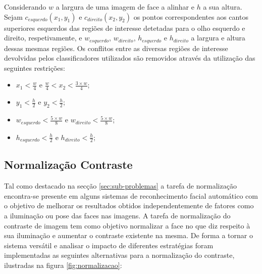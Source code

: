 Considerando $w$ a largura de uma imagem de face a alinhar e $h$ a sua altura. Sejam $c_{esquerdo}(x_1,y_1)$ e  $c_{direito}(x_2,y_2)$  os pontos correspondentes aos cantos superiores esquerdos das regiões de interesse detetadas para o olho esquerdo e direito, respetivamente, e $w_{esquerdo}$, $w_{direito}$, $h_{esquerdo}$ e $h_{direito}$ a largura e altura dessas mesmas regiões. Os conflitos entre as diversas regiões de interesse devolvidas pelos classificadores utilizados são removidos através da utilização das seguintes restrições:

\begin{itemize}
\item $x_1 < \frac{w}{4}$ e $\frac{w}{4} < x_2 < \frac{3\times w}{4}$;
\item $y_1 < \frac{h}{2}$ e $y_2 < \frac{h}{2}$;
\item $w_{esquerdo} < \frac{5\times w}{8}$ e $w_{direito} < \frac{5\times w}{8}$;
\item $h_{esquerdo} < \frac{h}{2}$ e $h_{direito} < \frac{h}{2}$;
\end{itemize}

\subsection{Normalização Contraste} \label{sec:normalizacao}

Tal como destacado na secção \ref{sec:sub-problemas} a tarefa de normalização encontra-se presente em alguns sistemas de reconhecimento facial automático com o objetivo de melhorar os resultados obtidos independentemente de fatores como a iluminação ou pose das faces nas imagens. A tarefa de normalização do contraste de imagem tem como objetivo normalizar a face no que diz respeito à sua iluminação e aumentar o contraste existente na mesma. De forma a tornar o sistema versátil e analisar o impacto de diferentes estratégias foram implementadas as seguintes alternativas para a normalização do contraste, ilustradas na figura \ref{fig:normalizacao}:

